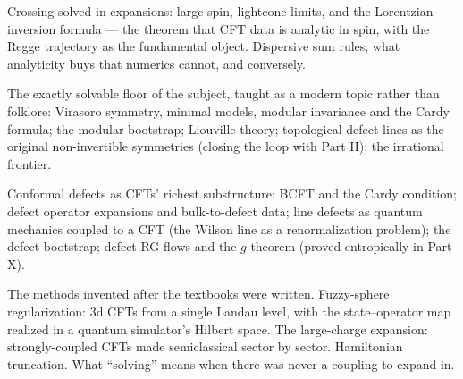 Crossing solved in expansions: large spin, lightcone limits, and the Lorentzian inversion formula --- the theorem that CFT data is analytic in spin, with the Regge trajectory as the fundamental object. Dispersive sum rules; what analyticity buys that numerics cannot, and conversely.

The exactly solvable floor of the subject, taught as a modern topic rather than folklore: Virasoro symmetry, minimal models, modular invariance and the Cardy formula; the modular bootstrap; Liouville theory; topological defect lines as the original non-invertible symmetries (closing the loop with Part II); the irrational frontier.

Conformal defects as CFTs' richest substructure: BCFT and the Cardy condition; defect operator expansions and bulk-to-defect data; line defects as quantum mechanics coupled to a CFT (the Wilson line as a renormalization problem); the defect bootstrap; defect RG flows and the $g$-theorem (proved entropically in Part X).

The methods invented after the textbooks were written. Fuzzy-sphere regularization: 3d CFTs from a single Landau level, with the state--operator map realized in a quantum simulator's Hilbert space. The large-charge expansion: strongly-coupled CFTs made semiclassical sector by sector. Hamiltonian truncation. What ``solving'' means when there was never a coupling to expand in.

